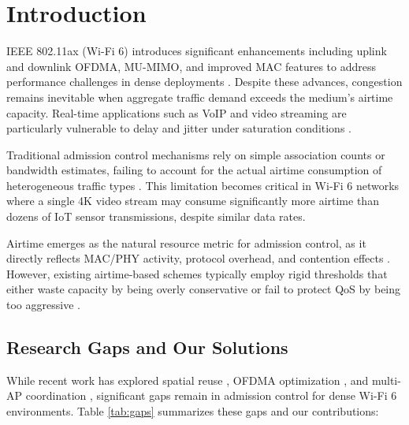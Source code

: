 \documentclass[conference]{IEEEtran}
\begin{document}
\section{Introduction}

IEEE 802.11ax (Wi-Fi 6) introduces significant enhancements including uplink and downlink OFDMA, MU-MIMO, and improved MAC features to address performance challenges in dense deployments \cite{2, 6}. Despite these advances, congestion remains inevitable when aggregate traffic demand exceeds the medium's airtime capacity. Real-time applications such as VoIP and video streaming are particularly vulnerable to delay and jitter under saturation conditions \cite{13}.

Traditional admission control mechanisms rely on simple association counts or bandwidth estimates, failing to account for the actual airtime consumption of heterogeneous traffic types \cite{3}. This limitation becomes critical in Wi-Fi 6 networks where a single 4K video stream may consume significantly more airtime than dozens of IoT sensor transmissions, despite similar data rates.

Airtime emerges as the natural resource metric for admission control, as it directly reflects MAC/PHY activity, protocol overhead, and contention effects \cite{16}. However, existing airtime-based schemes typically employ rigid thresholds that either waste capacity by being overly conservative or fail to protect QoS by being too aggressive \cite{10}.

\subsection{Research Gaps and Our Solutions}

While recent work has explored spatial reuse \cite{1, 17}, OFDMA optimization \cite{11, 15}, and multi-AP coordination \cite{18}, significant gaps remain in admission control for dense Wi-Fi 6 environments. Table \ref{tab:gaps} summarizes these gaps and our contributions:
\end{document}
